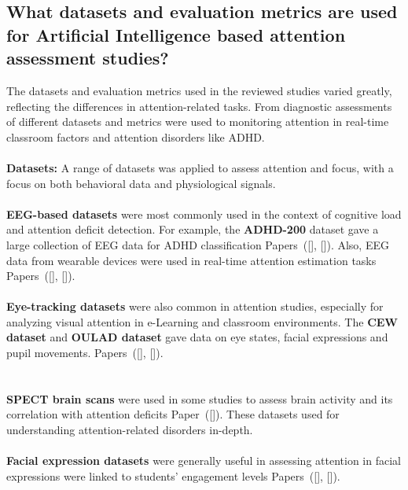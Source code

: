 \documentclass[twocolumn,12pt]{article}
\begin{document}
{\subsection{What datasets and evaluation metrics are used for Artificial Intelligence based attention assessment studies?}
The datasets and evaluation metrics used in the reviewed studies varied greatly, reflecting the differences in attention-related tasks. From diagnostic assessments of different datasets and metrics were used to monitoring attention in real-time classroom factors and attention disorders like ADHD. \\ \\
\textbf{Datasets:} A range of datasets was applied to assess attention and focus, with a focus on both behavioral data and physiological signals. \\ \\
\textbullet \textbf{EEG-based datasets} were most commonly used in the context of cognitive load and attention deficit detection.  For example, the \textbf{ADHD-200} dataset gave a large collection of EEG data for ADHD classification Papers~([\citealp{ref11}], [\citealp{ref19}]). Also, EEG data from wearable devices were used in real-time attention estimation tasks Papers~([\citealp{ref3}], [\citealp{ref4}]).  \\ \\
\textbullet \textbf{Eye-tracking datasets} were also common in attention studies, especially for analyzing visual attention in e-Learning and classroom environments. The \textbf{CEW dataset} and \textbf{OULAD dataset} gave data on eye states, facial expressions and pupil movements. Papers~([\citealp{ref7}], [\citealp{ref9}]).  \\ \\ \\
\textbullet \textbf{SPECT brain scans} were used in some studies to assess brain activity and its correlation with attention deficits Paper~([\citealp{ref19}]). These datasets used for understanding attention-related disorders in-depth.  \\ \\
\textbullet \textbf{Facial expression datasets} were generally useful in assessing attention in facial expressions were linked to students' engagement levels Papers~([\citealp{ref1}], [\citealp{ref9}]).  \\ \\

}
\end{document}
